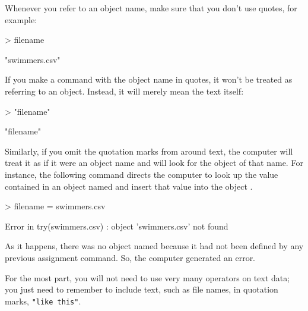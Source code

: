 \begin{description}
Whenever you refer to an object name, make sure that you don't use
quotes, for example:
\begin{Schunk}
\begin{Sinput}
> filename
\end{Sinput}
\begin{Soutput}
[1] "swimmers.csv"
\end{Soutput}
\end{Schunk}
If you make a command with the object name in quotes, it won't be
treated as referring to an object.  Instead, it will merely mean the
text itself:
\begin{Schunk}
\begin{Sinput}
> "filename"
\end{Sinput}
\begin{Soutput}
[1] "filename"
\end{Soutput}
\end{Schunk}
Similarly, if you omit the quotation marks from around text, the
computer will treat it as if it were an object name and will look for
the object of that name.  For instance, the following command
directs the computer to look up the value contained in an object named
 and insert that value into the object . 
\begin{Schunk}
\begin{Sinput}
> filename = swimmers.csv
\end{Sinput}
\end{Schunk}
\begin{Schunk}
\begin{Soutput}
Error in try(swimmers.csv) : object 'swimmers.csv' not found
\end{Soutput}
\end{Schunk}
As it happens, there was no object named  because
it had not been defined by any previous assignment command.  So, the
computer generated an error.


For the most part, you will not need to use very many operators on
text data; you just need to remember to include text, such as file
names, in quotation marks, \texttt{"like this"}. 

\end{description}


